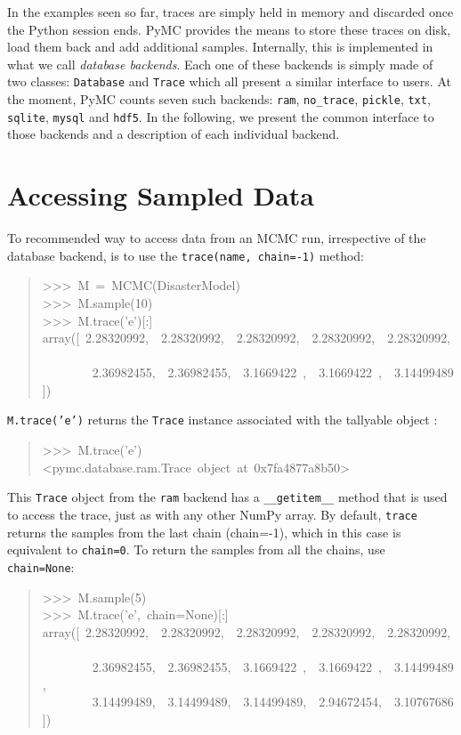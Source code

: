 

In the examples seen so far, traces are simply held in memory and discarded once
the Python session ends. PyMC provides the means to store these traces on disk, 
load them back and add additional samples. Internally, this is implemented in
what we call \emph{database backends}. Each one of these backends is simply made 
of two classes: \texttt{Database} and \texttt{Trace} which all present a similar 
interface to users. 
At the moment, PyMC counts seven such backends: \texttt{ram}, \texttt{no{\_}trace}, 
\texttt{pickle}, \texttt{txt}, \texttt{sqlite}, \texttt{mysql} and \texttt{hdf5}. 
In the following, we present the common interface to those backends and a 
description of each individual backend.



\hypertarget{accessing-sampled-data}{}
\section*{Accessing Sampled Data}

To recommended way to access data from an MCMC run, irrespective of the 
database backend, is to use the \texttt{trace(name, chain=-1)} method:
\begin{quote}{\ttfamily \raggedright \noindent
>{}>{}>~M~=~MCMC(DisasterModel)~\\
>{}>{}>~M.sample(10)~\\
>{}>{}>~M.trace('e'){[}:]~\\
array({[}~2.28320992,~~2.28320992,~~2.28320992,~~2.28320992,~~2.28320992,~\\
~~~~~~~~2.36982455,~~2.36982455,~~3.1669422~,~~3.1669422~,~~3.14499489])
}\end{quote}

\texttt{M.trace('e')} returns the \texttt{Trace} instance associated with the tallyable
object :
\begin{quote}{\ttfamily \raggedright \noindent
>{}>{}>~M.trace('e')~\\
<pymc.database.ram.Trace~object~at~0x7fa4877a8b50>
}\end{quote}

This \texttt{Trace} object from the \texttt{ram} backend has a \texttt{{\_}{\_}getitem{\_}{\_}} method 
that is used to access the trace, just as with any other NumPy array. 
By default, \texttt{trace} returns the samples from 
the last chain (chain=-1), which in this case is equivalent to \texttt{chain=0}. To 
return the samples from all the chains, use \texttt{chain=None}:
\begin{quote}{\ttfamily \raggedright \noindent
>{}>{}>~M.sample(5)~\\
>{}>{}>~M.trace('e',~chain=None){[}:]~\\
array({[}~2.28320992,~~2.28320992,~~2.28320992,~~2.28320992,~~2.28320992,~\\
~~~~~~~~2.36982455,~~2.36982455,~~3.1669422~,~~3.1669422~,~~3.14499489,~\\
~~~~~~~~3.14499489,~~3.14499489,~~3.14499489,~~2.94672454,~~3.10767686])
}\end{quote}


